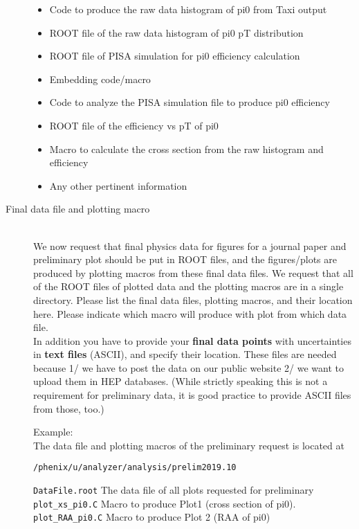 \documentclass[12pt]{article}
\begin{document}
\begin{description}
\begin{itemize}
\item Code to produce the raw data histogram of pi0 from Taxi output
\item ROOT file of the raw data histogram of pi0 pT distribution
\item ROOT file of PISA simulation for pi0 efficiency calculation
\item Embedding code/macro
\item Code to analyze the PISA simulation file to produce pi0 efficiency
\item ROOT file of the efficiency vs pT of pi0
\item Macro to calculate the cross section from the raw histogram and efficiency
\item Any other pertinent information
\end{itemize}
\item [Final data file and plotting macro]~\\
We now request that final physics data for figures for a journal paper and preliminary plot should be
put in ROOT files, and the figures/plots are produced by plotting macros from these final data files.
We request that all of the ROOT files of plotted data and the plotting macros are in a single
directory.
Please list the final data files, plotting macros, and their location here.
Please indicate which macro will produce with plot from which data file.\\

In addition you have to provide your {\bf final data points} with
uncertainties in {\bf text files} (ASCII), and specify their
location.  These files are needed because 1/ we have to post the data
on our public website 2/ we want to upload them in HEP databases.
(While strictly speaking this is not a requirement for preliminary
data, it is good practice to provide ASCII files from those, too.)

Example:\\
The data file and plotting macros of the preliminary request is located at
\begin{verbatim}
/phenix/u/analyzer/analysis/prelim2019.10
\end{verbatim}
\verb*|DataFile.root|  The data file of all plots requested for preliminary\\
\verb*|plot_xs_pi0.C|  Macro to produce Plot1 (cross section of pi0).\\
\verb*|plot_RAA_pi0.C|  Macro to produce Plot 2 (RAA of pi0)\\


\end{description}
\end{document}
